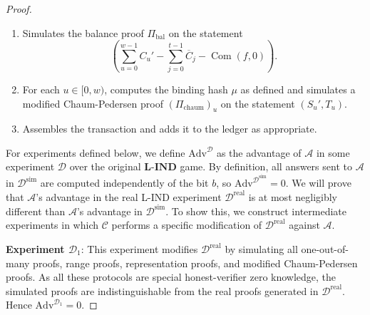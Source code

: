 \documentclass{llncs}
\newcommand{\com}{\operatorname{Com}}
\begin{document}
\begin{proof}
\begin{itemize}
\begin{enumerate}
\begin{enumerate}
\begin{enumerate}
                \item Samples a random input used to produce a symmetric encryption key $\text{AEADKeyGen} \to k_{\text{enc}}$.
                \item Simulates the value encryption by selecting random $\widetilde{v}$ of the proper length, and encrypting it to produce $$\text{AEADEncrypt}(k_{\text{enc}},\texttt{val},\widetilde{v}) \to \overline{v}_j.$$
                \item Simulates the memo encryption by selecting random $\widetilde{m}$ of the proper length, and encrypting it to produce $$\text{AEADEncrypt}(k_{\text{enc}},\texttt{memo},\widetilde{m}) \to \overline{m}_j.$$
                \item Simulates a range proof $(\Pi_{\text{rp}})_j$ on the statement $(\overline{C}_j)$.
            \end{enumerate}
        \end{enumerate}
        \item Simulates the balance proof $\Pi_{\text{bal}}$ on the statement $$\left(\sum_{u=0}^{w-1} C_u' - \sum_{j=0}^{t-1} \overline{C}_j - \com(f,0)\right).$$
        \item For each $u \in [0,w)$, computes the binding hash $\mu$ as defined and simulates a modified Chaum-Pedersen proof $(\Pi_{\text{chaum}})_u$ on the statement $(S_u', T_u)$.
        \item Assembles the transaction and adds it to the ledger as appropriate.
    \end{enumerate}
\end{itemize}

For experiments defined below, we define $\text{Adv}^{\mathcal{D}}$ as the advantage of $\mathcal{A}$ in some experiment $\mathcal{D}$ over the original $\textbf{L-IND}$ game.
By definition, all answers sent to $\mathcal{A}$ in $\mathcal{D}^{\text{sim}}$ are computed independently of the bit $b$, so $\text{Adv}^{\mathcal{D}^{\text{sim}}} = 0$. We will prove that $\mathcal{A}$'s advantage in the real L-IND experiment $\mathcal{D}^{\text{real}}$ is at most negligibly different than $\mathcal{A}$'s advantage in $\mathcal{D}^{\text{sim}}$.
To show this, we construct intermediate experiments in which $\mathcal{C}$ performs a specific modification of $\mathcal{D}^{\text{real}}$ against $\mathcal{A}$.

\textbf{Experiment $\mathcal{D}_1$}: This experiment modifies $\mathcal{D}^{\text{real}}$ by simulating all one-out-of-many proofs, range proofs, representation proofs, and modified Chaum-Pedersen proofs.
As all these protocols are special honest-verifier zero knowledge, the simulated proofs are indistinguishable from the real proofs generated in $\mathcal{D}^{\text{real}}$.
Hence $\text{Adv}^{\mathcal{D}_1} = 0$.


\end{proof}
\end{document}
